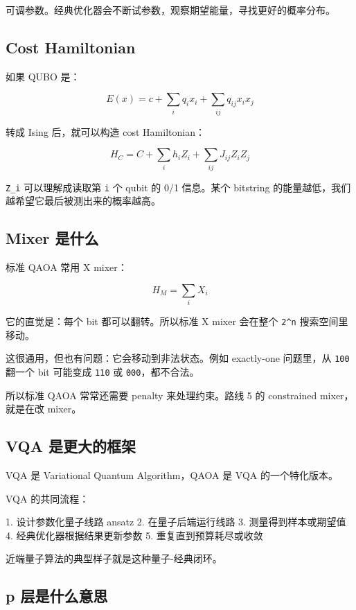 \documentclass[UTF8,12pt,a4paper]{ctexart}
\begin{document}
可调参数。经典优化器会不断试参数，观察期望能量，寻找更好的概率分布。

\subsection*{Cost Hamiltonian}

如果 QUBO 是：

\[
E(x) = c + \sum_{i} q_{i} x_{i} + \sum_{ij} q_{ij} x_{i} x_{j}
\]

转成 Ising 后，就可以构造 cost Hamiltonian：

\[
H_{C} = C + \sum_{i} h_{i} Z_{i} + \sum_{ij} J_{ij} Z_{i} Z_{j}
\]

\texttt{Z\_i} 可以理解成读取第 \texttt{i} 个 qubit 的 0/1 信息。某个 bitstring 的能量越低，我们越希望它最后被测出来的概率越高。

\subsection*{Mixer 是什么}

标准 QAOA 常用 X mixer：

\[
H_{M} = \sum_{i} X_{i}
\]

它的直觉是：每个 bit 都可以翻转。所以标准 X mixer 会在整个 \texttt{2\textasciicircum{}n} 搜索空间里移动。

这很通用，但也有问题：它会移动到非法状态。例如 exactly-one 问题里，从 \texttt{100} 翻一个 bit 可能变成 \texttt{110} 或 \texttt{000}，都不合法。

所以标准 QAOA 常常还需要 penalty 来处理约束。路线 5 的 constrained mixer，就是在改 mixer。

\subsection*{VQA 是更大的框架}

VQA 是 Variational Quantum Algorithm，QAOA 是 VQA 的一个特化版本。

VQA 的共同流程：

\begin{GuideVerbatim}
1. 设计参数化量子线路 ansatz
2. 在量子后端运行线路
3. 测量得到样本或期望值
4. 经典优化器根据结果更新参数
5. 重复直到预算耗尽或收敛
\end{GuideVerbatim}

近端量子算法的典型样子就是这种量子-经典闭环。

\subsection*{p 层是什么意思}
\end{document}
